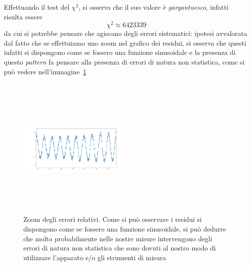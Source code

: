 \documentclass{article}
\begin{document}
\noindent Effettuando il test del $\chi^2$, si osserva che il suo valore è \emph{gargantuesco}, infatti risulta essere
$$
	\chi^2 \approx 6423339
$$
da cui si potrebbe pensare che agiscano degli errori sistematici: ipotesi avvalorata dal fatto che se effettuiamo uno zoom nel grafico dei residui, si osserva che questi infatti si dispongono come se fossero una funzione sinusoidale e la presenza di questo \emph{pattern} fa pensare alla presenza di errori di natura non statistica, come si può vedere nell'immagine~\ref{fig:residui}

\begin{figure}[H]
	\centering
	\includegraphics[width=0.5\textwidth, height=200pt]{Zoom_residui.png}
	\caption{Zoom degli errori relativi. Come si può osservare i residui si dispongono come se fossero una funzione sinusoidale, si può dedurre che molto probabilmente nelle nostre misure intervengono degli errori di natura non statistica che sono dovuti al nostro modo di utilizzare l'apparato e/o gli strumenti di misura}
	\label{fig:residui}
\end{figure}
\end{document}
